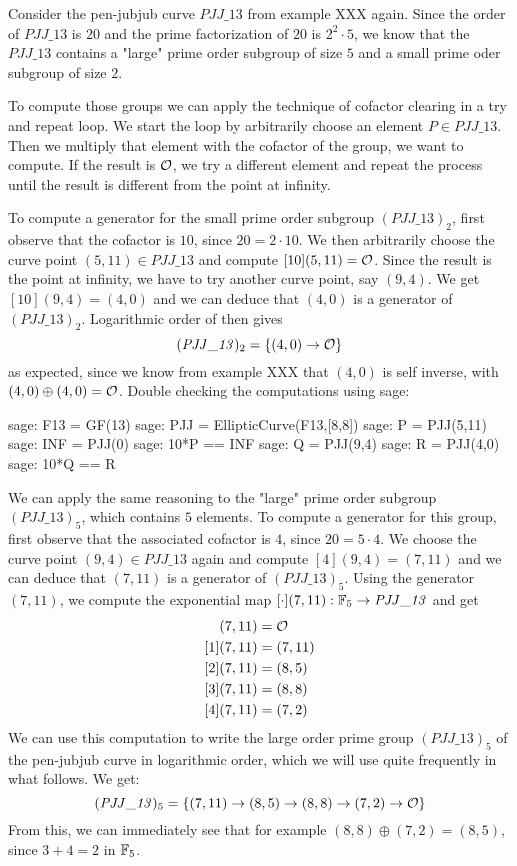 \begin{example} Consider the pen-jubjub curve $\mathit{PJJ\_13}$ from example XXX again. Since the order of $\mathit{PJJ\_13}$ is $20$ and the prime factorization of $20$ is $2^2\cdot 5$, we know that the $\mathit{PJJ\_13}$ contains a "large" prime order subgroup of size $5$ and a small prime oder subgroup of size $2$.

To compute those groups we can apply the technique of cofactor clearing in a try and repeat loop. We start the loop by arbitrarily choose an element $P\in \mathit{PJJ\_13}$. Then we multiply that element with the cofactor of the group, we want to compute. If the result is $\mathcal{O}$, we try a different element and repeat the process until the result is different from the point at infinity.

To compute a generator for the small prime order subgroup $(\mathit{PJJ\_13})_2$, first observe that the cofactor is $10$, since $20=2\cdot 10$. We then arbitrarily choose the curve point $(5,11)\in \mathit{PJJ\_13}$ and compute $[10](5,11)=\mathcal{O}$. Since the result is the point at infinity, we have to try another curve point, say $(9,4)$. We get $[10](9,4)=(4,0)$ and we can deduce that $(4,0)$ is a generator of $(\mathit{PJJ\_13})_2$. Logarithmic order of then gives
$$
(\mathit{PJJ\_13})_2 = \{(4,0)\to \mathcal{O}\}
$$
as expected, since we know from example XXX that $(4,0)$ is self inverse, with $(4,0)\oplus (4,0)=\mathcal{O}$. Double checking the computations using sage:
\begin{sagecommandline}
sage: F13 = GF(13)
sage: PJJ = EllipticCurve(F13,[8,8])
sage: P = PJJ(5,11)
sage: INF = PJJ(0)
sage: 10*P == INF
sage: Q = PJJ(9,4)
sage: R = PJJ(4,0)
sage: 10*Q == R
\end{sagecommandline}
We can apply the same reasoning to the "large" prime order subgroup $(\mathit{PJJ\_13})_5$, which contains $5$ elements. To compute a generator for this group, first observe that the associated cofactor is $4$, since $20=5\cdot 4$. We choose the curve point $(9,4)\in \mathit{PJJ\_13}$ again and compute $[4](9,4)=(7,11)$ and we can deduce that $(7,11)$ is a generator of $(\mathit{PJJ\_13})_5$. Using the generator $(7,11)$, we compute the exponential map $[\cdot](7,11): \mathbb{F}_5 \to \mathit{PJJ\_13}$ and get
\begin{align*}
[0](7,11) &= \Oinf\\
[1](7,11) &= (7,11)\\
[2](7,11) &= (8,5)\\
[3](7,11) &= (8,8)\\
[4](7,11) &= (7,2)
\end{align*}
We can use this computation to write the large order prime group $(\mathit{PJJ\_13})_5$ of the pen-jubjub curve in logarithmic order, which we will use quite frequently in what follows. We get:
$$
(\mathit{PJJ\_13})_5 = \{(7,11)\to(8,5)\to(8,8)\to(7,2)\to \mathcal{O}\}
$$
From this, we can immediately see that for example $(8,8)\oplus (7,2)= (8,5)$, since
$3+4=2$ in $\mathbb{F}_5$.
\end{example}
